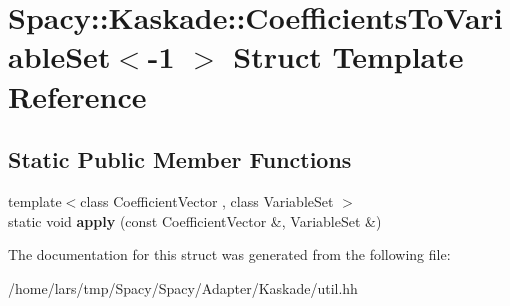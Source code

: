 \hypertarget{structSpacy_1_1Kaskade_1_1CoefficientsToVariableSet_3-1_01_4}{}\section{Spacy\+:\+:Kaskade\+:\+:Coefficients\+To\+Variable\+Set$<$-\/1 $>$ Struct Template Reference}
\label{structSpacy_1_1Kaskade_1_1CoefficientsToVariableSet_3-1_01_4}
\subsection*{Static Public Member Functions}
\begin{DoxyCompactItemize}
\item 
{\footnotesize template$<$class Coefficient\+Vector , class Variable\+Set $>$ }\\static void {\bfseries apply} (const Coefficient\+Vector \&, Variable\+Set \&)\hypertarget{structSpacy_1_1Kaskade_1_1CoefficientsToVariableSet_3-1_01_4_a0cd221cfb9e6fb4d459e2f302a85e743}{}\label{structSpacy_1_1Kaskade_1_1CoefficientsToVariableSet_3-1_01_4_a0cd221cfb9e6fb4d459e2f302a85e743}

\end{DoxyCompactItemize}


The documentation for this struct was generated from the following file\+:\begin{DoxyCompactItemize}
\item 
/home/lars/tmp/\+Spacy/\+Spacy/\+Adapter/\+Kaskade/util.\+hh\end{DoxyCompactItemize}
